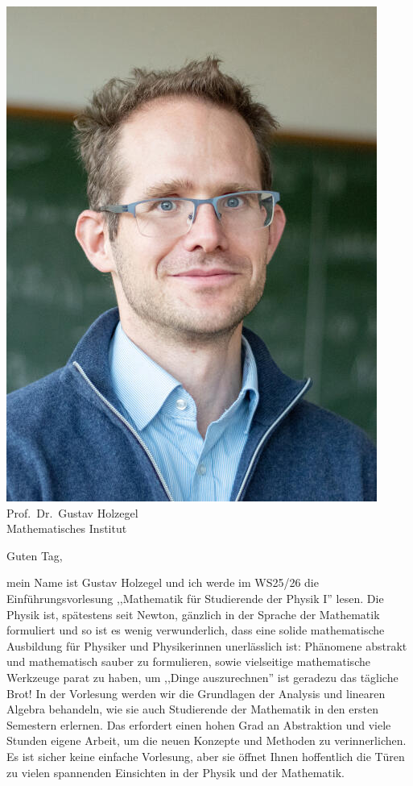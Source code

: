 \begin{multicols}{2}
\begin{center}
	\includegraphics[width=\columnwidth, height=0.35\textheight]{res/GustavHolzegel.jpeg}\\
	\smallskip
 	Prof.\ Dr.\ Gustav Holzegel\\
	Mathematisches Institut
\end{center}
Guten Tag,

mein Name ist Gustav Holzegel und ich werde im WS25/26 die Einführungsvorlesung ,,Mathematik für Studierende der Physik I” lesen. Die Physik ist, spätestens seit Newton, gänzlich in der Sprache der Mathematik formuliert und so ist es wenig verwunderlich, dass eine solide mathematische Ausbildung für Physiker und Physikerinnen unerlässlich ist: Phänomene abstrakt und mathematisch sauber zu formulieren, sowie vielseitige mathematische Werkzeuge parat zu haben, um ,,Dinge auszurechnen” ist geradezu das tägliche Brot! In der Vorlesung werden wir die Grundlagen der Analysis und linearen Algebra behandeln, wie sie auch Studierende der Mathematik in den ersten Semestern erlernen. Das erfordert einen hohen Grad an Abstraktion und viele Stunden eigene Arbeit, um die neuen Konzepte und Methoden zu verinnerlichen. Es ist sicher keine einfache Vorlesung, aber sie öffnet Ihnen hoffentlich die Türen zu vielen spannenden Einsichten in der Physik und der Mathematik.


\end{multicols}
